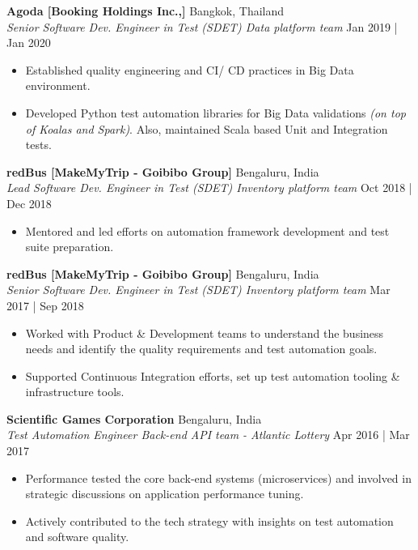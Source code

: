\documentclass[a4paper]{article}
\begin{document}
\textbf{Agoda [Booking Holdings Inc.,]} \hfill Bangkok, Thailand\\
\textit{Senior Software Dev. Engineer in Test (SDET) \textbar{} Data platform team} \hfill Jan 2019 | Jan 2020\\
\vspace{-1.5mm}
\begin{itemize} \setlength\itemsep{-0.3em}
	\item Established quality engineering and CI/ CD practices in Big Data environment.
	\item Developed Python test automation libraries for Big Data validations \textit{(on top of Koalas and Spark)}. Also, maintained Scala based Unit and Integration tests.
\end{itemize}

\textbf{redBus [MakeMyTrip - Goibibo Group]} \hfill Bengaluru, India\\
\textit{Lead Software Dev. Engineer in Test (SDET) \textbar{} Inventory platform team} \hfill Oct 2018 | Dec 2018\\
\vspace{-1.5mm}
\begin{itemize} \setlength\itemsep{-0.3em}
	\item Mentored and led efforts on automation framework development and test suite preparation.
\end{itemize}

\textbf{redBus [MakeMyTrip - Goibibo Group]} \hfill Bengaluru, India\\
\textit{Senior Software Dev. Engineer in Test (SDET) \textbar{} Inventory platform team} \hfill Mar 2017 | Sep 2018\\
\vspace{-1.5mm}
\begin{itemize} \setlength\itemsep{-0.3em}
	\item Worked with Product \& Development teams to understand the business needs and identify the quality requirements and test automation goals.
	\item Supported Continuous Integration efforts, set up test automation tooling \& infrastructure tools.
\end{itemize}

\textbf{Scientific Games Corporation} \hfill Bengaluru, India\\
\textit{Test Automation Engineer \textbar{} Back-end API team - Atlantic Lottery} \hfill Apr 2016 | Mar 2017\\
\vspace{-1.5mm}
\begin{itemize} \setlength\itemsep{-0.3em}
	\item Performance tested the core back-end systems (microservices) and involved in strategic discussions on application performance tuning.
	\item Actively contributed to the tech strategy with insights on test automation and software quality.
\end{itemize}
\end{document}
